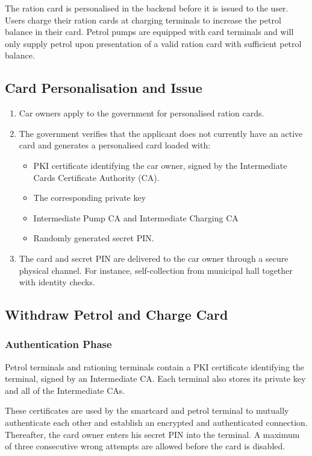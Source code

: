 The ration card is personalised in the backend before it is issued to the user. Users charge their ration cards at charging terminals to increase the petrol balance in their card. Petrol pumps are equipped with card terminals and will only supply petrol upon presentation of a valid ration card with sufficient petrol balance.

\subsection{Card Personalisation and Issue}

\begin{enumerate}
  \item Car owners apply to the government for personalised ration cards.
  \item The government verifies that the applicant does not currently have an active card and generates a personalised card loaded with: 
	\begin{itemize}
	  \item PKI certificate identifying the car owner, signed by the Intermediate Cards Certificate Authority (CA).
	  \item The corresponding private key
	  \item Intermediate Pump CA and Intermediate Charging CA
	  \item Randomly generated secret PIN.
	\end{itemize}
  \item The card and secret PIN are delivered to the car owner through a secure physical channel. For instance, self-collection from municipal hall together with identity checks.
\end{enumerate}

\subsection{Withdraw Petrol and Charge Card}
\subsubsection{Authentication Phase}
Petrol terminals and rationing terminals contain a PKI certificate identifying the terminal, signed by an Intermediate CA. Each terminal also stores its private key and all of the Intermediate CAs.

These certificates are used by the smartcard and petrol terminal to mutually authenticate each other and establish an encrypted and authenticated connection. Thereafter, the card owner enters his secret PIN into the terminal. A maximum of three consecutive wrong attempts are allowed before the card is disabled.

